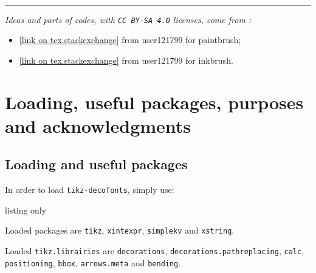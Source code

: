 \documentclass[11pt,a4paper]{ltxdoc}
\begin{document}
\begin{tcolorbox}[colframe=lightgray,colback=lightgray!5]
\hfill{}
\end{tcolorbox}

\vfill~

\hrule

\vspace*{5mm}

\textit{Ideas and parts of codes, with \texttt{CC\,BY-SA\,4.0} licenses, come from :}

\begin{itemize}
	\item \href{https://tex.stackexchange.com/questions/475141/simulating-paintbrush-strokes-in-tikz}{[link on tex.stackexchange]} from \textsf{user121799} for paintbrush;
	\item \href{https://tex.stackexchange.com/questions/460836/custom-line-cap-to-simulate-inked-line-in-tikz/460842#460842}{[link on tex.stackexchange]} from \textsf{user121799} for inkbrush.
\end{itemize}

\pagebreak


\hypertarget{matoc}{}

\tableofcontents

\vspace*{5mm}


\pagebreak

\section{Loading, useful packages, purposes and acknowledgments}

\subsection{Loading and useful packages}

In order to load \texttt{tikz-decofonts}, simply use:

\begin{DemoCode}{listing only}
\usepackage{tikz-decofonts}
\end{DemoCode}

Loaded packages are \texttt{tikz}, \texttt{xintexpr}, \texttt{simplekv} and \texttt{xstring}.

Loaded \texttt{tikz.librairies} are \texttt{decorations}, \texttt{decorations.pathreplacing}, \texttt{calc}, \texttt{positioning}, \texttt{bbox}, \texttt{arrows.meta} and \texttt{bending}.
\end{document}
